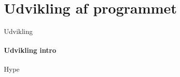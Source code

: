 \section{Udvikling af programmet}
\begin{frame}{Udvikling}
	\framesubtitle{Udvikling intro}
	Hype
\end{frame}